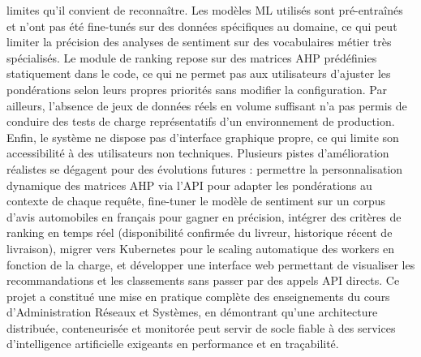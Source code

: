 limites qu'il convient de reconnaître. Les modèles ML utilisés sont pré-entraînés et n'ont pas été fine-tunés sur des données spécifiques au domaine, ce qui peut limiter la précision des analyses de sentiment sur des vocabulaires métier très spécialisés. Le module de ranking repose sur des matrices AHP prédéfinies statiquement dans le code, ce qui ne permet pas aux utilisateurs d'ajuster les pondérations selon leurs propres priorités sans modifier la configuration. Par ailleurs, l'absence de jeux de données réels en volume suffisant n'a pas permis de conduire des tests de charge représentatifs d'un environnement de production. Enfin, le système ne dispose pas d'interface graphique propre, ce qui limite son accessibilité à des utilisateurs non techniques. Plusieurs pistes d'amélioration réalistes se dégagent pour des évolutions futures : permettre la personnalisation dynamique des matrices AHP via l'API pour adapter les pondérations au contexte de chaque requête, fine-tuner le modèle de sentiment sur un corpus d'avis automobiles en français pour gagner en précision, intégrer des critères de ranking en temps réel (disponibilité confirmée du livreur, historique récent de livraison), migrer vers Kubernetes pour le scaling automatique des workers en fonction de la charge, et développer une interface web permettant de visualiser les recommandations et les classements sans passer par des appels API directs. Ce projet a constitué une mise en pratique complète des enseignements du cours d'Administration Réseaux et Systèmes, en démontrant qu'une architecture distribuée, conteneurisée et monitorée peut servir de socle fiable à des services d'intelligence artificielle exigeants en performance et en traçabilité.
